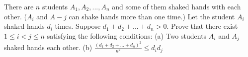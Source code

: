 There are $n$ students $A_1,A_2,...,A_n$ and some of them shaked hands with each other. ($A_i$ and $A-j$ can shake hands more than one time.) Let the student $A_i$ shaked hands $d_i$ times. Suppose $d_1 + d_2 +... + d_n > 0$. Prove that there exist $1 \le i < j \le n$ satisfying the following conditions:
(a) Two students $A_i$ and $A_j$ shaked hands each other.
(b) $\frac{(d_1 + d_2 +... + d_n)^2}{n^2}\le  d_id_j$